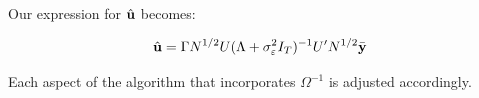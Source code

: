 


Our expression for $\hat{\mathbf{u}}$ becomes:

\begin{equation}
    \hat{\mathbf{u}} = 
   \Gamma 
    N^{1/2}U (\Lambda + \sigma_\varepsilon^2I_T)^{-1}U' N^{1/2} \bar{\mathbf{y}}  
\end{equation}

Each aspect of the algorithm that incorporates $\Omega^{-1}$ is adjusted accordingly.


